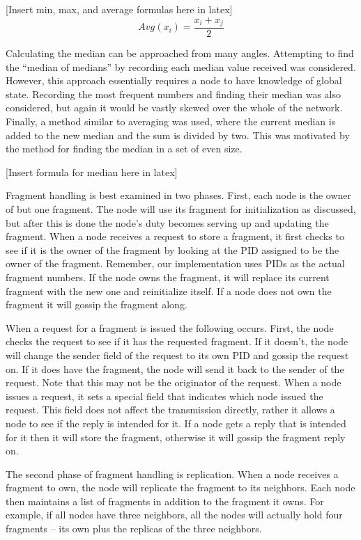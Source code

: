 [Insert min, max, and average formulas here in latex]
\begin{equation}
Avg(x_i)=\frac{x_i + x_j}{2}
\end{equation}


Calculating the median can be approached from many angles. Attempting to find the “median of medians” by recording each median value received was considered. However, this approach essentially requires a node to have knowledge of global state. Recording the most frequent numbers and finding their median was also considered, but again it would be vastly skewed over the whole of the network. Finally, a method similar to averaging was used, where the current median is added to the new median and the sum is divided by two. This was motivated by the method for finding the median in a set of even size.

[Insert formula for median here in latex]

Fragment handling is best examined in two phases. First, each node is the owner of but one fragment. The node will use its fragment for initialization as discussed, but after this is done the node’s duty becomes serving up and updating the fragment. When a node receives a request to store a fragment, it first checks to see if it is the owner of the fragment by looking at the PID assigned to be the owner of the fragment. Remember, our implementation uses PIDs as the actual fragment numbers. If the node owns the fragment, it will replace its current fragment with the new one and reinitialize itself. If a node does not own the fragment it will gossip the fragment along.

When a request for a fragment is issued the following occurs. First, the node checks the request to see if it has the requested fragment. If it doesn’t, the node will change the sender field of the request to its own PID and gossip the request on. If it does have the fragment, the node will send it back to the sender of the request. Note that this may not be the originator of the request. When a node issues a request, it sets a special field that indicates which node issued the request. This field does not affect the transmission directly, rather it allows a node to see if the reply is intended for it. If a node gets a reply that is intended for it then it will store the fragment, otherwise it will gossip the fragment reply on.

The second phase of fragment handling is replication. When a node receives a fragment to own, the node will replicate the fragment to its neighbors. Each node then maintains a list of fragments in addition to the fragment it owns. For example, if all nodes have three neighbors, all the nodes will actually hold four fragments – its own plus the replicas of the three neighbors.

